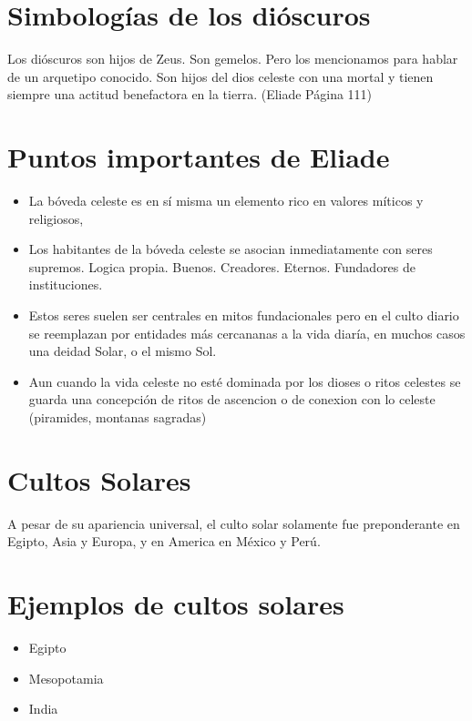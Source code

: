 \documentclass{report}
\begin{document}
\section*{Simbolog\'ias de los di\'oscuros}

Los di\'oscuros son hijos de Zeus. Son gemelos. Pero los mencionamos
para hablar de un arquetipo conocido. Son hijos del dios celeste con
una mortal y tienen siempre una actitud benefactora en la
tierra. (Eliade P\'agina 111)
 

\section*{Puntos importantes de Eliade}
\begin{itemize}
\item La b\'oveda celeste es en s\'i misma un elemento rico en valores
  m\'iticos y religiosos,
\item Los habitantes de la b\'oveda celeste se asocian inmediatamente
  con seres supremos. Logica
  propia. Buenos. Creadores. Eternos. Fundadores de instituciones. 
\item Estos seres suelen ser centrales en mitos fundacionales pero en
  el culto diario se reemplazan por entidades m\'as cercananas a la
  vida diar\'ia, en muchos casos una deidad Solar, o el mismo Sol.
\item Aun cuando la vida celeste no est\'e dominada por los dioses o
  ritos celestes se guarda una concepci\'on de ritos de ascencion o de
  conexion con lo celeste (piramides, montanas sagradas)
\end{itemize}

\section*{Cultos Solares}

A pesar de su apariencia universal, el culto solar solamente fue
preponderante en Egipto, Asia y Europa, y en America en M\'exico y
Per\'u. 

\section*{Ejemplos de cultos solares}

\begin{itemize}
\item Egipto
\item Mesopotamia
\item India
\end{itemize}
\end{document}
